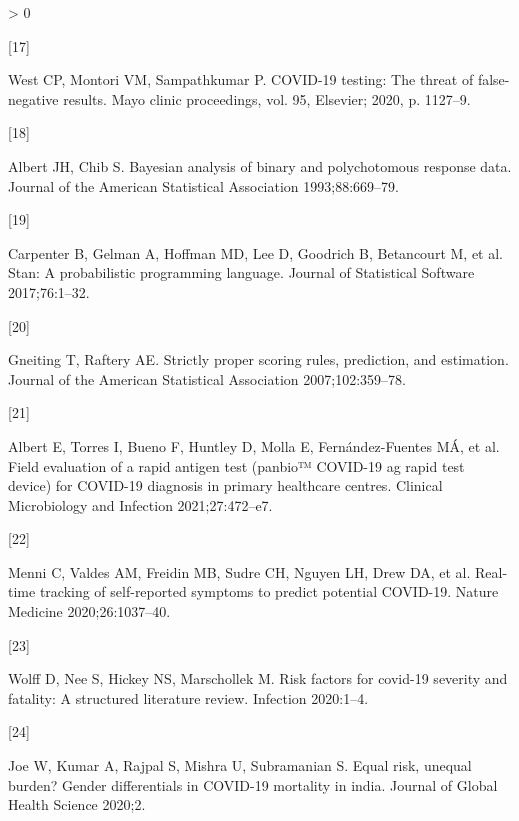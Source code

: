 \documentclass[]{elsarticle} %
\newlength{\cslhangindent}
\newlength{\csllabelwidth}
\newenvironment{CSLReferences}[2] %
 {%
  \setlength{\parindent}{0pt}
  \ifodd #1 \everypar{\setlength{\hangindent}{\cslhangindent}}\ignorespaces\fi
  \ifnum #2 > 0
  \setlength{\parskip}{#2\baselineskip}
  \fi
 }%
 {}
\newcommand{\CSLLeftMargin}[1]{\parbox[t]{\csllabelwidth}{#1}}
\newcommand{\CSLRightInline}[1]{\parbox[t]{\linewidth - \csllabelwidth}{#1}\break}
\begin{document}
\begin{CSLReferences}{0}{0}
\leavevmode\hypertarget{ref-west2020covid}{}%
\CSLLeftMargin{{[}17{]} }
\CSLRightInline{West CP, Montori VM, Sampathkumar P. COVID-19 testing: The threat of false-negative results. Mayo clinic proceedings, vol. 95, Elsevier; 2020, p. 1127--9.}

\leavevmode\hypertarget{ref-albert1993bayesian}{}%
\CSLLeftMargin{{[}18{]} }
\CSLRightInline{Albert JH, Chib S. Bayesian analysis of binary and polychotomous response data. Journal of the American Statistical Association 1993;88:669--79.}

\leavevmode\hypertarget{ref-carpenter2017stan}{}%
\CSLLeftMargin{{[}19{]} }
\CSLRightInline{Carpenter B, Gelman A, Hoffman MD, Lee D, Goodrich B, Betancourt M, et al. Stan: A probabilistic programming language. Journal of Statistical Software 2017;76:1--32.}

\leavevmode\hypertarget{ref-gneiting2007strictly}{}%
\CSLLeftMargin{{[}20{]} }
\CSLRightInline{Gneiting T, Raftery AE. Strictly proper scoring rules, prediction, and estimation. Journal of the American Statistical Association 2007;102:359--78.}

\leavevmode\hypertarget{ref-albert2021field}{}%
\CSLLeftMargin{{[}21{]} }
\CSLRightInline{Albert E, Torres I, Bueno F, Huntley D, Molla E, Fernández-Fuentes MÁ, et al. Field evaluation of a rapid antigen test (panbio™ COVID-19 ag rapid test device) for COVID-19 diagnosis in primary healthcare centres. Clinical Microbiology and Infection 2021;27:472--e7.}

\leavevmode\hypertarget{ref-menni2020real}{}%
\CSLLeftMargin{{[}22{]} }
\CSLRightInline{Menni C, Valdes AM, Freidin MB, Sudre CH, Nguyen LH, Drew DA, et al. Real-time tracking of self-reported symptoms to predict potential COVID-19. Nature Medicine 2020;26:1037--40.}

\leavevmode\hypertarget{ref-wolff2020risk}{}%
\CSLLeftMargin{{[}23{]} }
\CSLRightInline{Wolff D, Nee S, Hickey NS, Marschollek M. Risk factors for covid-19 severity and fatality: A structured literature review. Infection 2020:1--4.}

\leavevmode\hypertarget{ref-joe2020equal}{}%
\CSLLeftMargin{{[}24{]} }
\CSLRightInline{Joe W, Kumar A, Rajpal S, Mishra U, Subramanian S. Equal risk, unequal burden? Gender differentials in COVID-19 mortality in india. Journal of Global Health Science 2020;2.}

\end{CSLReferences}
\end{document}
